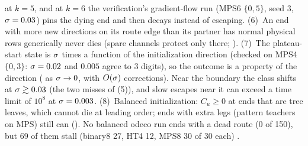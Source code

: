 at $k=5$, and at $k=6$ the verification's gradient-flow run (MPS6 $\{0,5\}$, seed 3, $\sigma=0.03$) pins the dying end
and then decays instead of escaping. (6)~An end with more new directions on its route edge than its partner has
normal physical rows generically never dies (spare channels protect only there; \derived). (7)~The plateau-start
state is $\sigma$ times a function of the initialization direction (checked on MPS4 $\{0,3\}$: $\sigma=0.02$ and $0.005$
agree to 3 digits), so the outcome is a property of the direction (\derived{} as $\sigma\to0$, with $O(\sigma)$
corrections). Near the boundary the class shifts at $\sigma\gtrsim0.03$ (the two misses of (5)), and slow escapes near
it can exceed a time limit of $10^8$ at $\sigma=0.003$. (8)~Balanced initialization: $C_u\ge0$ at ends that are tree leaves, which cannot die at leading order;
ends with extra legs (pattern teachers on MPS) still can (\derived). No balanced odeco run ends with a dead route (0
of 150), but 69 of them stall (binary8 27, HT4 12, MPS8 30 of 30 each) \empirical.

